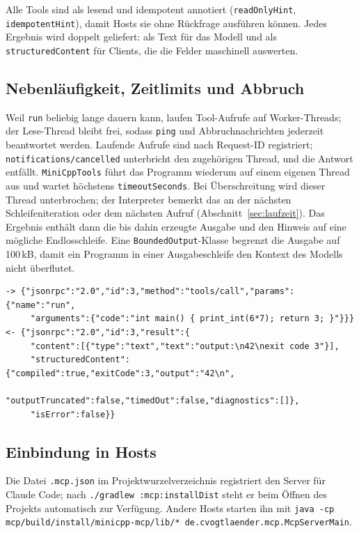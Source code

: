 \documentclass[11pt,a4paper,parskip=half,headsepline,toc=flat]{scrartcl}
\newcommand{\code}[1]{\texttt{#1}}
\newcommand{\dquote}{\textquotedbl}
\begin{document}
Alle Tools sind als lesend und idempotent annotiert (\code{readOnlyHint}, \code{idempotentHint}), damit Hosts sie
ohne Rückfrage ausführen können. Jedes Ergebnis wird doppelt geliefert: als Text für das Modell und als
\code{structuredContent} für Clients, die die Felder maschinell auswerten.

\subsection{Nebenläufigkeit, Zeitlimits und Abbruch}
Weil \code{run} beliebig lange dauern kann, laufen Tool-Aufrufe auf Worker-Threads; der Lese-Thread bleibt frei, sodass
\code{ping} und Abbruchnachrichten jederzeit beantwortet werden. Laufende Aufrufe sind nach Request-ID registriert;
\code{notifications/cancelled} unterbricht den zugehörigen Thread, und die Antwort entfällt. \code{MiniCppTools}
führt das Programm wiederum auf einem eigenen Thread aus und wartet höchstens \code{timeoutSeconds}. Bei
Überschreitung wird dieser Thread unterbrochen; der Interpreter bemerkt das an der nächsten Schleifeniteration oder
dem nächsten Aufruf (Abschnitt~\ref{sec:laufzeit}). Das Ergebnis enthält dann die bis dahin erzeugte Ausgabe und den
Hinweis auf eine mögliche Endlosschleife. Eine \code{BoundedOutput}-Klasse begrenzt die Ausgabe auf 100\,kB, damit
ein Programm in einer Ausgabeschleife den Kontext des Modells nicht überflutet.

\begin{lstlisting}[caption={Ein \code{run}-Aufruf auf Protokollebene (gekürzt)}]
-> {"jsonrpc":"2.0","id":3,"method":"tools/call","params":{"name":"run",
     "arguments":{"code":"int main() { print_int(6*7); return 3; }"}}}
<- {"jsonrpc":"2.0","id":3,"result":{
     "content":[{"type":"text","text":"output:\n42\nexit code 3"}],
     "structuredContent":{"compiled":true,"exitCode":3,"output":"42\n",
                          "outputTruncated":false,"timedOut":false,"diagnostics":[]},
     "isError":false}}
\end{lstlisting}

\subsection{Einbindung in Hosts}
Die Datei \code{.mcp.json} im Projektwurzelverzeichnis registriert den Server für Claude Code; nach
\code{./gradlew :mcp:installDist} steht er beim Öffnen des Projekts automatisch zur Verfügung. Andere Hosts starten
ihn mit \code{java -cp \dquote mcp/build/install/minicpp-mcp/lib/*\dquote{} de.cvogtlaender.mcp.McpServerMain}.
\end{document}
